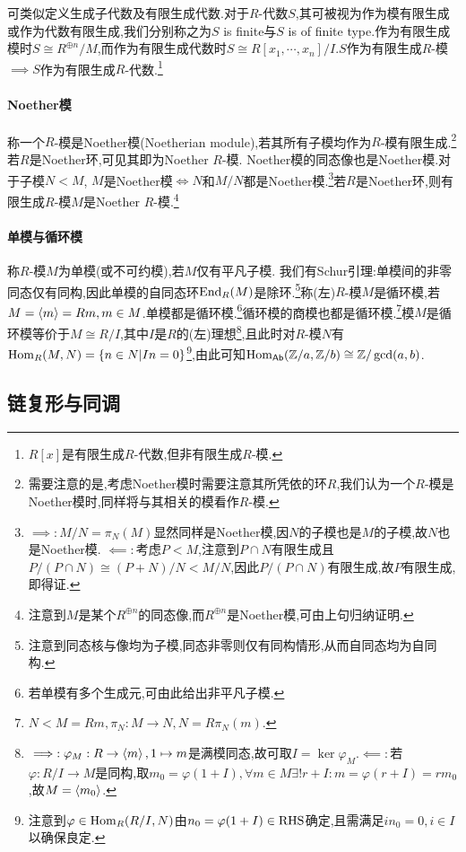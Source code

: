 \documentclass[11pt]{article} %
\begin{document}
可类似定义生成子代数及有限生成代数.对于$R$-代数$S$,其可被视为作为模有限生成或作为代数有限生成,我们分别称之为$S$ is finite与$S$ is of finite type.作为有限生成模时$S\cong R^{\oplus n}/M$,而作为有限生成代数时$S\cong R[x_1,\cdots,x_n]/I$.$S$作为有限生成$R$-模$\implies S$作为有限生成$R$-代数.\footnote{$R[x]$是有限生成$R$-代数,但非有限生成$R$-模.}

\paragraph{Noether模}
称一个$R$-模是Noether模(Noetherian module),若其所有子模均作为$R$-模有限生成.\footnote{需要注意的是,考虑Noether模时需要注意其所凭依的环$R$,我们认为一个$R$-模是Noether模时,同样将与其相关的模看作$R$-模.}若$R$是Noether环,可见其即为Noether $R$-模. Noether模的同态像也是Noether模.对于子模$N<M$, $M$是Noether模$\iff N$和$M/N$都是Noether模.\footnote{$\implies: M/N=\pi_N(M)$显然同样是Noether模,因$N$的子模也是$M$的子模,故$N$也是Noether模. $\impliedby:$考虑$P<M$,注意到$P\cap N$有限生成且$P/(P\cap N)\cong (P+N)/N<M/N$,因此$P/(P\cap N)$有限生成,故$P$有限生成,即得证.}若$R$是Noether环,则有限生成$R$-模$M$是Noether $R$-模.\footnote{注意到$M$是某个$R^{\oplus n}$的同态像,而$R^{\oplus n}$是Noether模,可由上句归纳证明.}

\paragraph{单模与循环模}
称$R$-模$M$为单模(或不可约模),若$M$仅有平凡子模. 我们有Schur引理:单模间的非零同态仅有同构,因此单模的自同态环$\operatorname{End}_{R}(M)$是除环.\footnote{注意到同态核与像均为子模,同态非零则仅有同构情形,从而自同态均为自同构.}称(左)$R$-模$M$是循环模,若$M=\left<m\right>=Rm, m\in M$.单模都是循环模.\footnote{若单模有多个生成元,可由此给出非平凡子模.}循环模的商模也都是循环模.\footnote{$N<M=Rm, \pi_N:M\to N, N=R\pi_N(m)$.}模$M$是循环模等价于$M\cong R/I$,其中$I$是$R$的(左)理想\footnote{$\implies: \varphi_M:R\to \left<m\right>, 1\mapsto m$是满模同态,故可取$I=\ker\varphi_M$.$\impliedby:$若$\varphi:R/I\to M$是同构,取$m_0=\varphi(1+I), \forall m\in M\exists! r+I: m=\varphi(r+I)=rm_0$,故$M=\left<m_0\right>$.},且此时对$R$-模$N$有$\operatorname{Hom}_R(M,N)=\left\{n\in N | In=0\right\}$\footnote{注意到$\varphi\in \operatorname{Hom}_R(R/I,N)$由$n_0=\varphi(1+I)\in \operatorname{RHS}$确定,且需满足$in_0=0, i\in I$以确保良定.},由此可知$\operatorname{Hom}_{\mathsf{Ab}}(\mathbb{Z}/a, \mathbb{Z}/b)\cong \mathbb{Z}/\gcd(a,b)$.

\subsection{链复形与同调}
\end{document}
